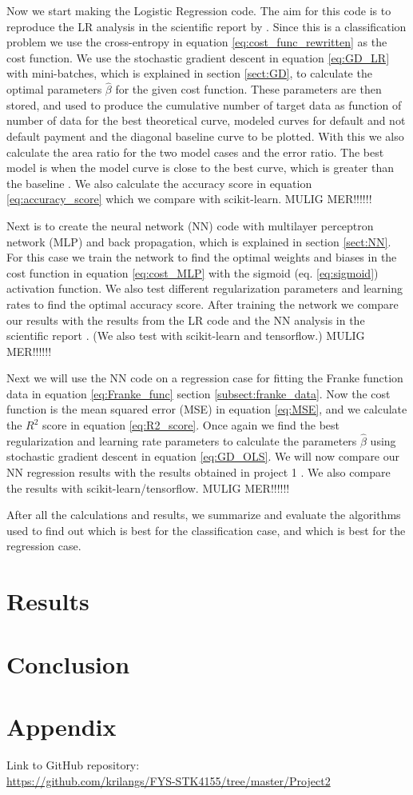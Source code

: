 \documentclass[12pt,a4paper,english]{article}
\begin{document}
Now we start making the Logistic Regression code. The aim for this code is to reproduce the LR analysis in the scientific report by \citet{origarticle}. Since this is a classification problem we use the cross-entropy in equation \ref{eq:cost_func_rewritten} as the cost function. We use the stochastic gradient descent in equation \ref{eq:GD_LR} with mini-batches, which is explained in section \ref{sect:GD}, to calculate the optimal parameters $\hat{\beta}$ for the given cost function. These parameters are then stored, and used to produce the cumulative number of target data as function of number of data for the best theoretical curve, modeled curves for default and not default payment and the diagonal baseline curve to be plotted. With this we also calculate the area ratio for the two model cases and the error ratio. The best model is when the model curve is close to the best curve, which is greater than the baseline \cite{origarticle}. We also calculate the accuracy score in equation \ref{eq:accuracy_score} which we compare with scikit-learn.
MULIG MER!!!!!!

Next is to create the neural network (NN) code with multilayer perceptron network (MLP) and back propagation, which is explained in section \ref{sect:NN}. For this case we train the network to find the optimal weights and biases in the cost function in equation \ref{eq:cost_MLP} with the sigmoid (eq. \ref{eq:sigmoid}) activation function. We also test different regularization parameters and learning rates to find the optimal accuracy score. After training the network we compare our results with the results from the LR code and the NN analysis in the scientific report \cite{origarticle}. (We also test with scikit-learn and tensorflow.) 
MULIG MER!!!!!!

Next we will use the NN code on a regression case for fitting the Franke function data in equation \ref{eq:Franke_func} section \ref{subsect:franke_data}. Now the cost function is the mean squared error (MSE) in equation \ref{eq:MSE}, and we calculate the $R^2$ score in equation \ref{eq:R2_score}. Once again we find the best regularization and learning rate parameters to calculate the parameters $\hat{\beta}$ using stochastic gradient descent in equation \ref{eq:GD_OLS}. We will now compare our NN regression results with the results obtained in project 1 \cite{proj1}. We also compare the results with scikit-learn/tensorflow.
MULIG MER!!!!!!

After all the calculations and results, we summarize and evaluate the algorithms used to find out which is best for the classification case, and which is best for the regression case.

\section{Results}
\section{Conclusion}
\appendix
\section{Appendix}
\label{sect:Appendix}
Link to GitHub repository:\\
\url{https://github.com/krilangs/FYS-STK4155/tree/master/Project2}



\end{document}
